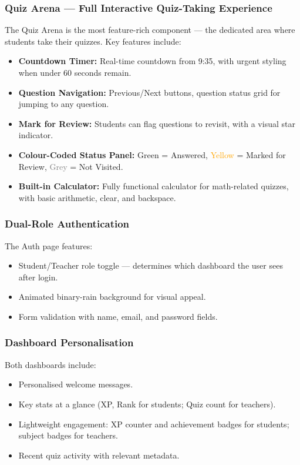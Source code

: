 \documentclass[12pt,a4paper]{article}
\begin{document}
\subsubsection{Quiz Arena --- Full Interactive Quiz-Taking Experience}

The Quiz Arena is the most feature-rich component --- the dedicated area where
students take their quizzes. Key features include:

\begin{itemize}[leftmargin=1.5em]
  \item \textbf{Countdown Timer:} Real-time countdown from 9:35, with urgent
        styling when under 60 seconds remain.
  \item \textbf{Question Navigation:} Previous/Next buttons, question status
        grid for jumping to any question.
  \item \textbf{Mark for Review:} Students can flag questions to revisit, with
        a visual star indicator.
  \item \textbf{Colour-Coded Status Panel:} \textcolor{accent}{Green} =
        Answered, \textcolor{orange}{Yellow} = Marked for Review,
        \textcolor{gray}{Grey} = Not Visited.
  \item \textbf{Built-in Calculator:} Fully functional calculator for
        math-related quizzes, with basic arithmetic, clear, and backspace.
\end{itemize}

\subsubsection{Dual-Role Authentication}

The Auth page features:
\begin{itemize}[leftmargin=1.5em]
  \item Student/Teacher role toggle --- determines which dashboard the user
        sees after login.
  \item Animated binary-rain background for visual appeal.
  \item Form validation with name, email, and password fields.
\end{itemize}

\subsubsection{Dashboard Personalisation}

Both dashboards include:
\begin{itemize}[leftmargin=1.5em]
  \item Personalised welcome messages.
  \item Key stats at a glance (XP, Rank for students; Quiz count for teachers).
  \item Lightweight engagement: XP counter and achievement badges for students;
        subject badges for teachers.
  \item Recent quiz activity with relevant metadata.
\end{itemize}
\end{document}
